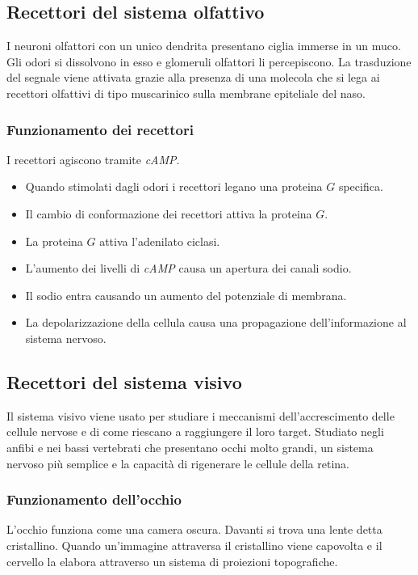 	
	\subsection{Recettori del sistema olfattivo}
	I neuroni olfattori con un unico dendrita presentano ciglia immerse in un muco.
	Gli odori si dissolvono in esso e glomeruli olfattori li percepiscono.
	La trasduzione del segnale viene attivata grazie alla presenza di una molecola che si lega ai recettori olfattivi di tipo muscarinico sulla membrane epiteliale del naso.

		\subsubsection{Funzionamento dei recettori}
		I recettori agiscono tramite \emph{cAMP}.
		\begin{multicols}{2}
			\begin{itemize}
				\item Quando stimolati dagli odori i recettori legano una proteina $G$ specifica.
				\item Il cambio di conformazione dei recettori attiva la proteina $G$.
				\item La proteina $G$ attiva l'adenilato ciclasi.
				\item L'aumento dei livelli di \emph{cAMP} causa un apertura dei canali sodio.
				\item Il sodio entra causando un aumento del potenziale di membrana.
				\item La depolarizzazione della cellula causa una propagazione dell'informazione al sistema nervoso.
			\end{itemize}
		\end{multicols}

	\subsection{Recettori del sistema visivo}
	Il sistema visivo viene usato per studiare i meccanismi dell'accrescimento delle cellule nervose e di come riescano a raggiungere il loro target.
	Studiato negli anfibi e nei bassi vertebrati che presentano occhi molto grandi, un sistema nervoso pi\`u semplice e la capacit\`a di rigenerare le cellule della retina.
	
		\subsubsection{Funzionamento dell'occhio}
		L'occhio funziona come una camera oscura.
		Davanti si trova una lente detta cristallino.
		Quando un'immagine attraversa il cristallino viene capovolta e il cervello la elabora attraverso un sistema di proiezioni topografiche.
		
